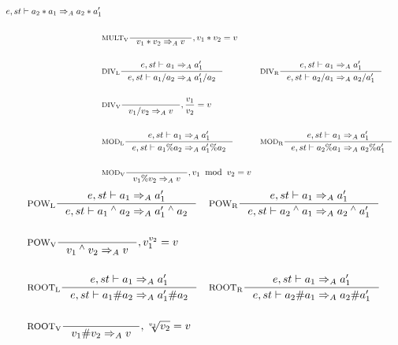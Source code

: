 \begin{align*}
                     {e,st \vdash a_2 * a_1 \Rightarrow_A a_2 * a_1'}
\\\\
&\inference[$\text{MULT}_\text{V}$]{}
                     {v_1 * v_2 \Rightarrow_A v}
										 {, v_1 * v_2 = v}
\\\\
&\inference[$\text{DIV}_\text{L}$]{e,st \vdash a_1 \Rightarrow_A a_1'}
                    {e,st \vdash a_1 / a_2 \Rightarrow_A a_1' / a_2}
&
&\inference[$\text{DIV}_\text{R}$]{e,st \vdash a_1 \Rightarrow_A a_1'}
                    {e,st \vdash a_2 / a_1 \Rightarrow_A a_2 / a_1'}
\\\\
&\inference[$\text{DIV}_\text{V}$]{}
                    {v_1 / v_2 \Rightarrow_A v}
										{, \frac{v_1}{v_2} = v}
\\\\
&\inference[$\text{MOD}_\text{L}$]{e,st \vdash a_1 \Rightarrow_A a_1'}
                    {e,st \vdash a_1 \% a_2 \Rightarrow_A a_1' \% a_2}
&
&\inference[$\text{MOD}_\text{R}$]{e,st \vdash a_1 \Rightarrow_A a_1'}
                    {e,st \vdash a_2 \% a_1 \Rightarrow_A a_2 \% a_1'}
\\\\
&\inference[$\text{MOD}_\text{V}$]{}
                    {v_1 \% v_2 \Rightarrow_A v}
										{, v_1 \;\; \textrm{mod} \;\; v_2 = v}
\end{align*}
\begin{align*}
&\inference[$\text{POW}_\text{L}$]{e,st \vdash a_1  \Rightarrow_A a_1'}
                    {e,st \vdash a_1 \Twedge a_2 \Rightarrow_A a_1' \Twedge a_2}
&
&\inference[$\text{POW}_\text{R}$]{e,st \vdash a_1 \Rightarrow_A a_1'}
                    {e,st \vdash a_2 \Twedge a_1 \Rightarrow_A a_2 \Twedge a_1'}
\\\\
&\inference[$\text{POW}_\text{V}$]{}
                    {v_1 \Twedge v_2 \Rightarrow_A v}
										{, v_1 ^ {v_2} = v}
\\\\
&\inference[$\text{ROOT}_\text{L}$]{e,st \vdash a_1 \Rightarrow_A a_1'}
                    {e,st \vdash a_1 \# a_2 \Rightarrow_A a_1' \# a_2}
&
&\inference[$\text{ROOT}_\text{R}$]{e,st \vdash a_1 \Rightarrow_A a_1'}
                    {e,st \vdash a_2 \# a_1 \Rightarrow_A a_2 \# a_1'}
\\\\
&\inference[$\text{ROOT}_\text{V}$]{}
                    {v_1 \# v_2 \Rightarrow_A v}
										{, \sqrt[v_1]{v_2} = v}
\end{align*}

